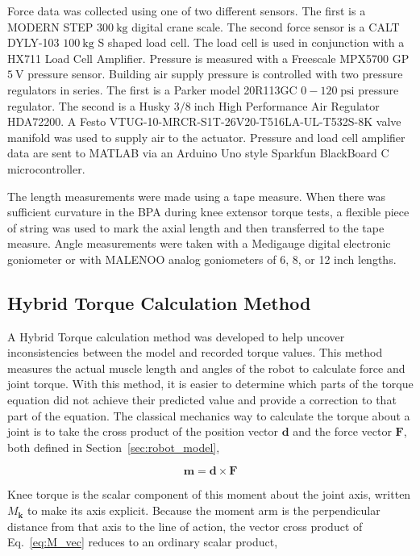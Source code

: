 Force data was collected using one of two different sensors. The first is a MODERN STEP $\qty{300}{\kilo\gram}$ digital crane scale. The second force sensor is a CALT DYLY-103 $\qty{100}{\kilo\gram}$ S shaped load cell. The load cell is used in conjunction with a HX711 Load Cell Amplifier. Pressure is measured with a Freescale MPX5700 GP $\qty{5}{\volt}$ pressure sensor. Building air supply pressure is controlled with two pressure regulators in series. The first is a Parker model 20R113GC $0-120\; \text{psi}$ pressure regulator. The second is a Husky $3/8 \; \text{inch}$ High Performance Air Regulator HDA72200. A Festo VTUG-10-MRCR-S1T-26V20-T516LA-UL-T532S-8K valve manifold was used to supply air to the actuator. Pressure and load cell amplifier data are sent to MATLAB via an Arduino Uno style Sparkfun BlackBoard C microcontroller. 


The length measurements were made using a tape measure. When there was sufficient curvature in the BPA during knee extensor torque tests, a flexible piece of string was used to mark the axial length and then transferred to the tape measure. Angle measurements were taken with a Medigauge digital electronic goniometer or with MALENOO analog goniometers of 6, 8, or 12 inch lengths.  

\subsection{Hybrid Torque Calculation Method}\label{sec:hybrid_method}


A Hybrid Torque calculation method was developed to help uncover inconsistencies between the model and recorded torque values. This method measures the actual muscle length and angles of the robot to calculate force and joint torque. With this method, it is easier to determine which parts of the torque equation did not achieve their predicted value and provide a correction to that part of the equation. The classical mechanics way to calculate the torque about a joint is to take the cross product of the position vector $\mathbf{d}$ and the force vector $\mathbf{F}$, both defined in Section~\ref{sec:robot_model},

\begin{equation}
    \mathbf{m} = \mathbf{d} \times \mathbf{F} \label{eq:M_vec}
\end{equation}

Knee torque is the scalar component of this moment about the joint axis, written $M_{\mathbf{k}}$ to make its axis explicit. Because the moment arm is the perpendicular distance from that axis to the line of action, the vector cross product of Eq.~\eqref{eq:M_vec} reduces to an ordinary scalar product,

